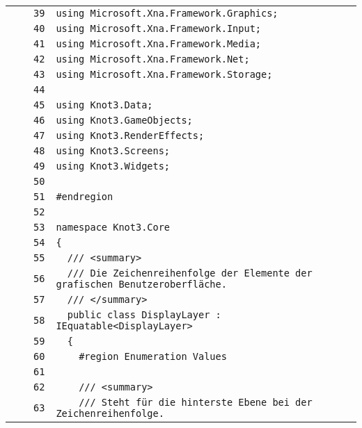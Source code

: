 \documentclass[a4paper,10pt]{article}
\begin{document}
\begin{longtable}[l]{lrrl}
\cellcolor{gray} &  & \verb~39~ & \verb~using Microsoft.Xna.Framework.Graphics;~\\
\cellcolor{gray} &  & \verb~40~ & \verb~using Microsoft.Xna.Framework.Input;~\\
\cellcolor{gray} &  & \verb~41~ & \verb~using Microsoft.Xna.Framework.Media;~\\
\cellcolor{gray} &  & \verb~42~ & \verb~using Microsoft.Xna.Framework.Net;~\\
\cellcolor{gray} &  & \verb~43~ & \verb~using Microsoft.Xna.Framework.Storage;~\\
\cellcolor{gray} &  & \verb~44~ & \verb~~\\
\cellcolor{gray} &  & \verb~45~ & \verb~using Knot3.Data;~\\
\cellcolor{gray} &  & \verb~46~ & \verb~using Knot3.GameObjects;~\\
\cellcolor{gray} &  & \verb~47~ & \verb~using Knot3.RenderEffects;~\\
\cellcolor{gray} &  & \verb~48~ & \verb~using Knot3.Screens;~\\
\cellcolor{gray} &  & \verb~49~ & \verb~using Knot3.Widgets;~\\
\cellcolor{gray} &  & \verb~50~ & \verb~~\\
\cellcolor{gray} &  & \verb~51~ & \verb~#endregion~\\
\cellcolor{gray} &  & \verb~52~ & \verb~~\\
\cellcolor{gray} &  & \verb~53~ & \verb~namespace Knot3.Core~\\
\cellcolor{gray} &  & \verb~54~ & \verb~{~\\
\cellcolor{gray} &  & \verb~55~ & \verb~  /// <summary>~\\
\cellcolor{gray} &  & \verb~56~ & \verb~  /// Die Zeichenreihenfolge der Elemente der grafischen Benutzeroberfläche.~\\
\cellcolor{gray} &  & \verb~57~ & \verb~  /// </summary>~\\
\cellcolor{gray} &  & \verb~58~ & \verb~  public class DisplayLayer : IEquatable<DisplayLayer>~\\
\cellcolor{gray} &  & \verb~59~ & \verb~  {~\\
\cellcolor{gray} &  & \verb~60~ & \verb~    #region Enumeration Values~\\
\cellcolor{gray} &  & \verb~61~ & \verb~~\\
\cellcolor{gray} &  & \verb~62~ & \verb~    /// <summary>~\\
\cellcolor{gray} &  & \verb~63~ & \verb~    /// Steht für die hinterste Ebene bei der Zeichenreihenfolge.~\\

\end{longtable}
\end{document}
